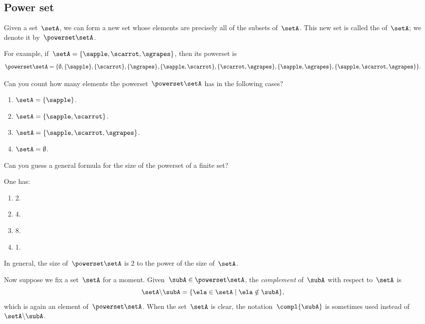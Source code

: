\subsection{Power set}
\label{sec:power-set}

Given a set~$\setA$, we can form a new set whose elements are precisely all of the subsets of~$\setA$.
This new set is called the  of~$\setA$; we denote it by~$\powerset \setA$.

For example, if~$\setA = \{ \sapple, \scarrot, \sgrapes \}$, then its powerset is
\begin{equation*}
    \powerset \setA = \{ \emptyset, \{ \sapple \}, \{ \scarrot \}, \{ \sgrapes\}, \{ \sapple, \scarrot \}, \{ \scarrot, \sgrapes \}, \{ \sapple, \sgrapes\}, \{ \sapple, \scarrot, \sgrapes \} \}.
\end{equation*}

\begin{exercise}
    Can you count how many elements the powerset~$\powerset \setA$ has in the following cases?
    \begin{enumerate}
        \item $\setA = \{ \sapple \} $.
        \item $\setA = \{ \sapple, \scarrot \} $.
        \item $\setA = \{ \sapple, \scarrot, \sgrapes \} $.
        \item $\setA = \emptyset $.
    \end{enumerate}
    Can you guess a general formula for the size of the powerset of a finite set?
\end{exercise}

\begin{solution}
    One has:
    \begin{enumerate}
        \item 2.
        \item 4.
        \item 8.
        \item 1.
    \end{enumerate}
    In general, the size of~$\powerset \setA$ is $2$ to the power of the size of~$\setA$.
\end{solution}

Now suppose we fix a set~$\setA$ for a moment.
Given~$\subA \in \powerset \setA$, the \emph{complement} of~$\subA$ with respect to~$\setA$ is
\begin{equation*}
    \setA \backslash \subA = \{ \ela \in \setA \mid \ela \notin \subA \},
\end{equation*}
which is again an element of~$\powerset \setA$.
When the set~$\setA$ is clear, the notation~$\compl{\subA}$ is sometimes used instead of~$\setA \backslash \subA$.

